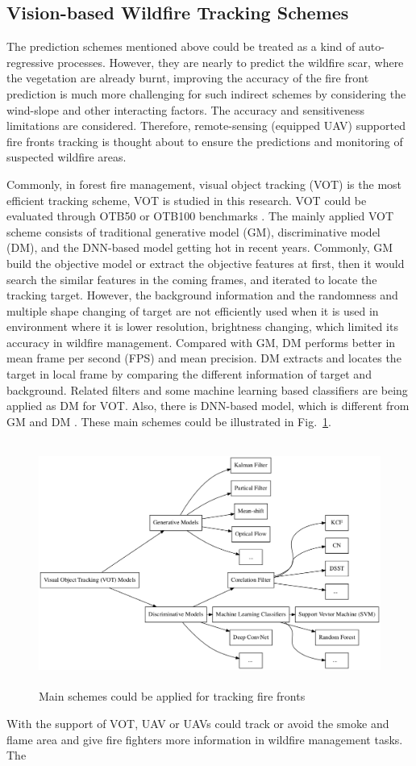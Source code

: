 \subsection{Vision-based Wildfire Tracking Schemes}
The prediction schemes mentioned above could be treated as a kind of auto-regressive processes. However, they are nearly to predict the wildfire scar, where the vegetation are already burnt, improving the accuracy of the fire front prediction is much more challenging for such indirect schemes by considering the wind-slope and other interacting factors. The accuracy and sensitiveness limitations are considered. Therefore, remote-sensing (equipped UAV) supported fire fronts tracking is thought about to ensure the predictions and monitoring of suspected wildfire areas.\par
Commonly, in forest fire management, visual object tracking (VOT) is the most efficient tracking scheme, VOT is studied in this research. VOT could be evaluated through OTB50 or OTB100 benchmarks \cite{wu2013online}. The mainly applied VOT scheme consists of traditional 
generative model (GM),
discriminative model (DM),
and the DNN-based model getting hot in recent years. 
Commonly, GM build the objective model or extract the objective features at first, then it would search the similar features in the coming frames, and iterated to locate the tracking target. However, the background information and the randomness and multiple shape changing of target are not efficiently used when it is used in environment where it is lower resolution, brightness changing, which limited its accuracy in wildfire management. Compared with GM, DM performs better in mean frame per second (FPS) and mean precision. DM extracts and locates the target in local frame by comparing the different information of target and background. Related filters and some machine learning based classifiers are being applied as DM for VOT. Also, there is DNN-based model, which is different from GM and DM \cite{krebs2017survey}. These main schemes could be illustrated in Fig.~\ref{fig:figuretrackingmodel}.
\begin{figure}[ht]
    \centering
    \includegraphics[height=80mm]{figs/figuretrackingmodel.png}
    \caption{Main schemes could be applied for tracking fire fronts}
    \label{fig:figuretrackingmodel}
\end{figure}
\par
With the support of VOT, UAV or UAVs could track or avoid the smoke and flame area and give fire fighters more information in wildfire management tasks. The 
\vspace{-0.3cm}
